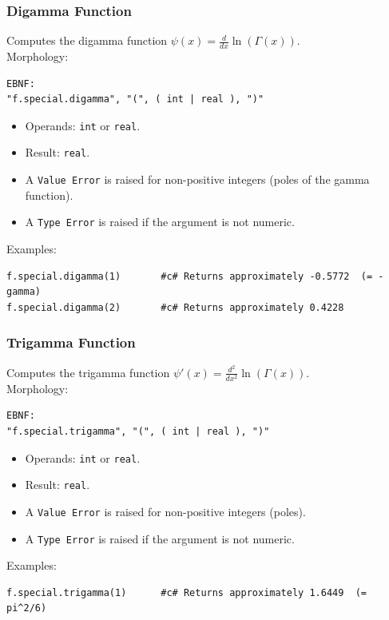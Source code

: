 \subsubsection{Digamma Function}
Computes the digamma function $\psi(x) = \frac{d}{dx} \ln(\Gamma(x))$. \\
Morphology:
\begin{verbatim}
EBNF:
"f.special.digamma", "(", ( int | real ), ")"
\end{verbatim}
\begin{itemize}
\item Operands: \texttt{int} or \texttt{real}.
\item Result: \texttt{real}.
\item A \texttt{Value Error} is raised for non-positive integers (poles of the gamma function).
\item A \texttt{Type Error} is raised if the argument is not numeric.
\end{itemize}
Examples:
\begin{verbatim}
f.special.digamma(1)       #c# Returns approximately -0.5772  (= -gamma)
f.special.digamma(2)       #c# Returns approximately 0.4228
\end{verbatim}

\subsubsection{Trigamma Function}
Computes the trigamma function $\psi'(x) = \frac{d^2}{dx^2} \ln(\Gamma(x))$. \\
Morphology:
\begin{verbatim}
EBNF:
"f.special.trigamma", "(", ( int | real ), ")"
\end{verbatim}
\begin{itemize}
\item Operands: \texttt{int} or \texttt{real}.
\item Result: \texttt{real}.
\item A \texttt{Value Error} is raised for non-positive integers (poles).
\item A \texttt{Type Error} is raised if the argument is not numeric.
\end{itemize}
Examples:
\begin{verbatim}
f.special.trigamma(1)      #c# Returns approximately 1.6449  (= pi^2/6)
\end{verbatim}

